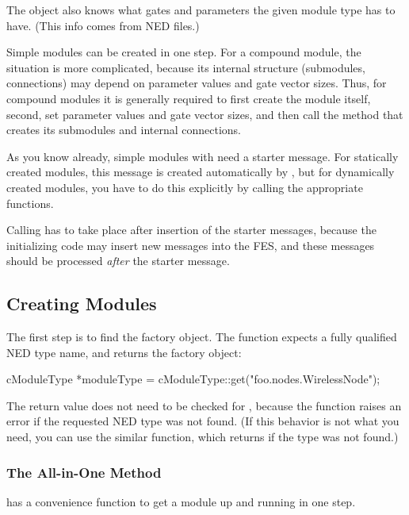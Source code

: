 The  object also knows what gates and
parameters the given module type has to have. (This info comes from
NED files.)

Simple modules can be created in one step. For a compound module, the
situation is more complicated, because its internal structure
(submodules, connections) may depend on parameter values and gate
vector sizes. Thus, for compound modules it is generally required to
first create the module itself, second, set parameter values and gate
vector sizes, and then call the method that creates its submodules and
internal connections.

As you know already, simple modules with  need a
starter message. For statically created
modules, this message is created automatically by {\opp}, but for
dynamically created modules, you have to do this explicitly by calling
the appropriate functions.

Calling  has to take place after insertion of the
starter messages, because the initializing code may insert new messages
into the FES, and these messages should be processed
\textit{after} the starter message.


\subsection{Creating Modules}

The first step is to find the factory object. The 
function expects a fully qualified NED type name, and returns the factory
object:

\begin{cpp}
cModuleType *moduleType = cModuleType::get("foo.nodes.WirelessNode");
\end{cpp}

The return value does not need to be checked for , because
the function raises an error if the requested NED type was not found.
(If this behavior is not what you need, you can use the similar
 function, which returns  if the type
was not found.)

\subsubsection{The All-in-One Method}

 has a  convenience function to get a module up
and running in one step.

